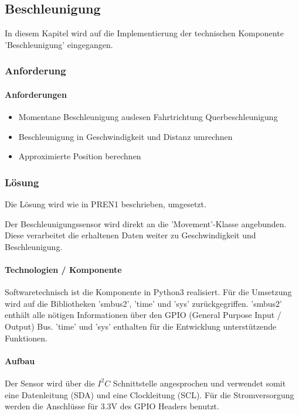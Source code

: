 \documentclass[../../main.tex]{subfiles}
\begin{document}
\subsection{Beschleunigung}
In diesem Kapitel wird auf die Implementierung der technischen Komponente 'Beschleunigung' eingegangen.
\subsubsection{Anforderung}

\paragraph{Anforderungen}
\begin{itemize}
    \item Momentane Beschleunigung auslesen
      \subitem Fahrtrichtung
      \subitem Querbeschleunigung
    \item Beschleunigung in Geschwindigkeit und Distanz umrechnen
    \item Approximierte Position berechnen
\end{itemize}

\subsubsection{Lösung}
Die Lösung wird wie in PREN1 beschrieben, umgesetzt.

Der Beschleunigungssensor wird direkt an die 'Movement'-Klasse angebunden. Diese verarbeitet die erhaltenen Daten weiter zu Geschwindigkeit und Beschleunigung.

\paragraph{Technologien / Komponente}
Softwaretechnisch ist die Komponente in Python3 realisiert. Für die Umsetzung wird auf die Bibliotheken 'smbus2', 'time' und 'sys' zurückgegriffen. 'smbus2' enthält alle nötigen Informationen über den GPIO (General Purpose Input / Output) Bus. 'time' und 'sys' enthalten für die Entwicklung unterstützende Funktionen.

\paragraph{Aufbau}
Der Sensor wird über die $I^2C$ Schnittstelle angesprochen und verwendet somit eine Datenleitung (SDA) und eine Clockleitung (SCL). Für die Stromversorgung werden die Anschlüsse für 3.3V des GPIO Headers benutzt.
\end{document}
